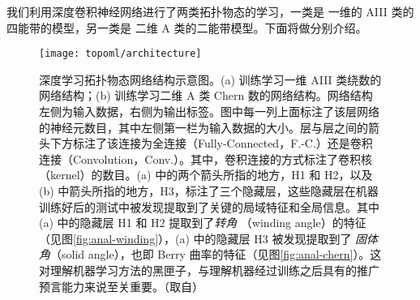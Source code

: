 我们利用深度卷积神经网络进行了两类拓扑物态的学习，一类是 一维的 AIII 类的四能带的模型，另一类是 二维 A 类的二能带模型。下面将做分别介绍。

\begin{figure}[t]
\centering
\texttt{[image: topoml/architecture]}
\caption{深度学习拓扑物态网络结构示意图。(a) 训练学习一维 AIII 类绕数的网络结构；(b) 训练学习二维 A 类 Chern 数的网络结构。网络结构左侧为输入数据，右侧为输出标签。图中每一列上面标注了该层网络的神经元数目，其中左侧第一栏为输入数据的大小。层与层之间的箭头下方标注了该连接为全连接（Fully-Connected，F.-C.）还是卷积连接（Convolution，Conv.）。其中，卷积连接的方式标注了卷积核（kernel）的数目。(a) 中的两个箭头所指的地方，H1 和 H2，以及 (b) 中箭头所指的地方，H3，标注了三个隐藏层，这些隐藏层在机器训练好后的测试中被发现提取到了关键的局域特征和全局信息。其中 (a) 中的隐藏层 H1 和 H2 提取到了\textit{转角} （winding angle）的特征（见图\ref{fig:anal-winding}），(a) 中的隐藏层 H3 被发现提取到了 \textit{固体角}（solid angle），也即 Berry 曲率的特征（见图\ref{fig:anal-chern}）。这对理解机器学习方法的黑匣子，与理解机器经过训练之后具有的推广预言能力来说至关重要。（取自）}
\label{fig:architecture}
\end{figure}




